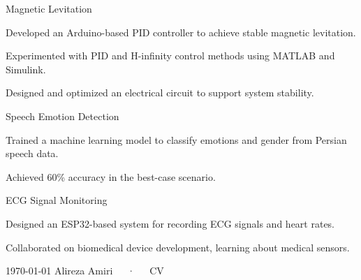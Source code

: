 \documentclass[11pt, a4paper]{awesome-cv}
\begin{document}
	\cvproject
	{Magnetic Levitation}
	{
		\begin{cvitems}
			\item {Developed an Arduino-based PID controller to achieve stable magnetic levitation.}
			\item {Experimented with PID and H-infinity control methods using MATLAB and Simulink.}
			\item {Designed and optimized an electrical circuit to support system stability.}
		\end{cvitems}
	}
	\cvproject
	{Speech Emotion Detection}
	{
		\begin{cvitems}
			\item {Trained a machine learning model to classify emotions and gender from Persian speech data.}
			\item {Achieved 60\% accuracy in the best-case scenario.}
		\end{cvitems}
	}
	\cvproject
	{ECG Signal Monitoring}
	{
		\begin{cvitems}
			\item {Designed an ESP32-based system for recording ECG signals and heart rates.}
			\item {Collaborated on biomedical device development, learning about medical sensors.}
		\end{cvitems}
	}
	
	
	
	\makecvfooter
	{\today}
	{Alireza Amiri~~~·~~~CV}
	{\thepage}
	
\end{document}
